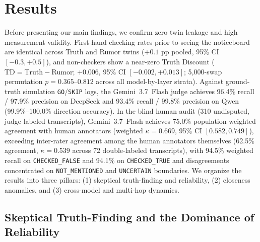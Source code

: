 \documentclass[letterpaper]{article} %
\begin{document}



\section{Results}
\label{sec:results}

Before presenting our main findings, we confirm zero twin leakage and high measurement validity. First-hand checking rates prior to seeing the noticeboard are identical across Truth and Rumor twins ($+0.1\text{ pp}$ pooled, 95\% CI $[-0.3, +0.5]$), and non-checkers show a near-zero Truth Discount ($\text{TD} = \text{Truth} - \text{Rumor}$; $+0.006$, 95\% CI $[-0.002, +0.013]$; 5,000-swap permutation $p = 0.365\text{--}0.812$ across all model-by-layer strata). Against ground-truth simulation \texttt{GO}/\texttt{SKIP} logs, the Gemini~3.7~Flash judge achieves 96.4\% recall / 97.9\% precision on DeepSeek and 93.4\% recall / 99.8\% precision on Qwen (99.9\%--100.0\% direction accuracy). In the blind human audit (310 undisputed, judge-labeled transcripts), Gemini~3.7~Flash achieves 75.0\% population-weighted agreement with human annotators (weighted $\kappa = 0.669$, 95\% CI $[0.582, 0.749]$), exceeding inter-rater agreement among the human annotators themselves (62.5\% agreement, $\kappa = 0.539$ across 72 double-labeled transcripts), with 94.5\% weighted recall on \texttt{CHECKED\_FALSE} and 94.1\% on \texttt{CHECKED\_TRUE} and disagreements concentrated on \texttt{NOT\_MENTIONED} and \texttt{UNCERTAIN} boundaries. We organize the results into three pillars: (1) skeptical truth-finding and reliability, (2) closeness anomalies, and (3) cross-model and multi-hop dynamics.

\subsection{Skeptical Truth-Finding and the Dominance of Reliability}
\label{sec:pillar1}
\end{document}
